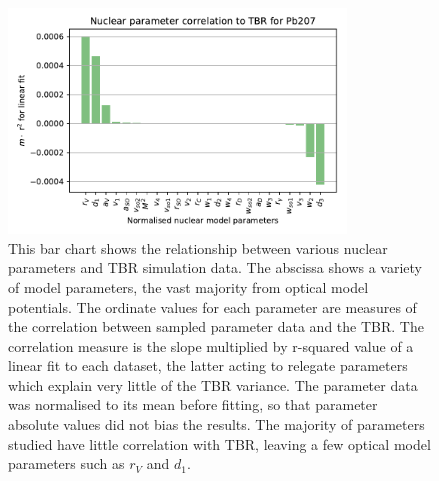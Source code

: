\begin{figure}[H]
  \centering
	\includegraphics[width=0.8\textwidth]{Pb207_param_correl}
	\caption{This bar chart shows the relationship between various nuclear parameters and TBR simulation data. The abscissa shows a variety of model parameters, the vast majority from optical model potentials. The ordinate values for each parameter are measures of the correlation between sampled parameter data and the TBR. The correlation measure is the slope multiplied by r-squared value of a linear fit to each dataset, the latter acting to relegate parameters which explain very little of the TBR variance. The parameter data was normalised to its mean before fitting, so that parameter absolute values did not bias the results. The majority of parameters studied have little correlation with TBR, leaving a few optical model parameters such as $r_{V}$ and $d_{1}$.}
	\label{fig:pb207_param_correl}
\end{figure}

%



